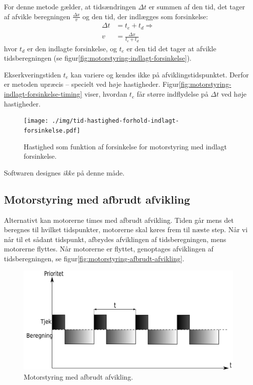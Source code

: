 For denne metode gælder, at tidsændringen $\Delta t$ er summen af den
tid, det tager af afvikle beregningen $\frac{\Delta x}v$ og den tid,
der indlægges som forsinkelse:
\begin{align}
  \Delta t &= t_e + t_d \Rightarrow \label{eq:afbrudt-afvikling-tid} \\
  v &= \frac{\Delta x}{t_e + t_d}
\end{align}
hvor $t_d$ er den indlagte forsinkelse, og $t_e$ er den tid det tager
at afvikle tidsberegningen (se figur\vref{fig:motorstyring-indlagt-forsinkelse}).

Ekserkveringstiden $t_e$ kan variere og kendes ikke på
afviklingstidspunktet. Derfor er metoden upræcis -- specielt ved høje
hastigheder. Figur\vref{fig:motorstyring-indlagt-forsinkelse-timing}
viser, hvordan $t_e$ får større indflydelse på $\Delta t$ ved høje
hastigheder.

\begin{figure}[htbp]
  \centering
  \texttt{[image: ./img/tid-hastighed-forhold-indlagt-forsinkelse.pdf]}
  \caption{Hastighed som funktion af forsinkelse for motorstyring med
    indlagt forsinkelse.}
  \label{fig:motorstyring-indlagt-forsinkelse-timing}
\end{figure}

Softwaren designes \textit{ikke} på denne måde.


\subsection{Motorstyring med afbrudt afvikling}

Alternativt kan motorerne times med afbrudt afvikling. Tiden går mens
det beregnes til hvilket tidspunkter, motorerne skal køres frem til
næste step. Når vi når til et sådant tidspunkt, afbrydes afviklingen
af tidsberegningen, mens motorerne flyttes. Når motorerne er flyttet,
genoptages afviklingen af tidsberegningen, se
figur\vref{fig:motorstyring-afbrudt-afvikling}.

\begin{figure}[htbp]
  \centering
  \includegraphics[width=.8\textwidth]{../brugere/kjaergaard/motorstyring-afbrudt-afvikling}
  \caption{Motorstyring med afbrudt afvikling.}
  \label{fig:motorstyring-afbrudt-afvikling}
\end{figure}

